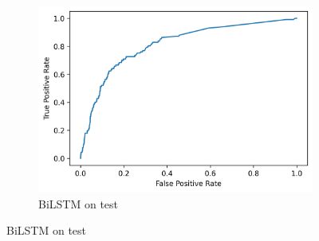 \documentclass[utf8x]{ctexart}
\begin{document}
\begin{figure}[htb]
\begin{subfigure}[b]{0.32\textwidth}
  \end{subfigure}
  \begin{subfigure}[b]{0.32\textwidth}
    \centering
    \includegraphics[width=\textwidth]{../images/BiLSTM_test_roc.png}
    \caption{BiLSTM on test}
    \label{fig:BiLSTM_roc_test}
  \end{subfigure}



\end{figure}
\end{document}
